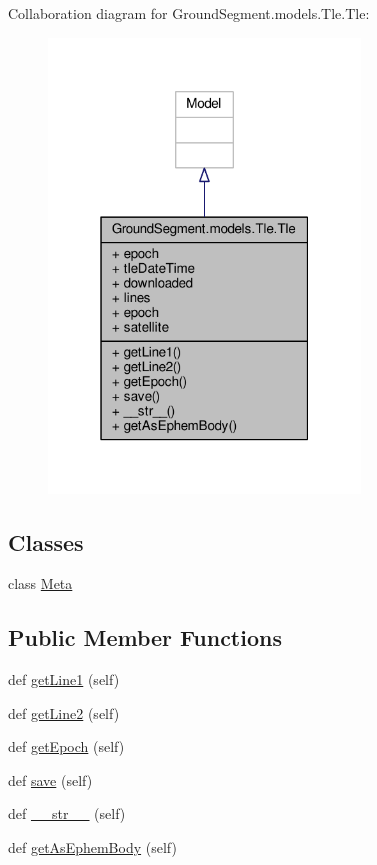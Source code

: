 Collaboration diagram for Ground\+Segment.\+models.\+Tle.\+Tle\+:\nopagebreak
\begin{figure}[H]
\begin{center}
\leavevmode
\includegraphics[width=235pt]{class_ground_segment_1_1models_1_1_tle_1_1_tle__coll__graph}
\end{center}
\end{figure}
\subsection*{Classes}
\begin{DoxyCompactItemize}
\item 
class \hyperlink{class_ground_segment_1_1models_1_1_tle_1_1_tle_1_1_meta}{Meta}
\end{DoxyCompactItemize}
\subsection*{Public Member Functions}
\begin{DoxyCompactItemize}
\item 
def \hyperlink{class_ground_segment_1_1models_1_1_tle_1_1_tle_aaa9c5ef171cfeab993957d279ded8364}{get\+Line1} (self)
\item 
def \hyperlink{class_ground_segment_1_1models_1_1_tle_1_1_tle_a904163c4f0018e52ddbd06a520787c6b}{get\+Line2} (self)
\item 
def \hyperlink{class_ground_segment_1_1models_1_1_tle_1_1_tle_a049797b0a8b8006dbe6c65c2fef60b33}{get\+Epoch} (self)
\item 
def \hyperlink{class_ground_segment_1_1models_1_1_tle_1_1_tle_af9530755ce563a47367a4636878d63bb}{save} (self)
\item 
def \hyperlink{class_ground_segment_1_1models_1_1_tle_1_1_tle_a4d73692ec117481d770952be352f0e6b}{\+\_\+\+\_\+str\+\_\+\+\_\+} (self)
\item 
def \hyperlink{class_ground_segment_1_1models_1_1_tle_1_1_tle_a336e418e8038a25a0953b828857bb2c8}{get\+As\+Ephem\+Body} (self)
\end{DoxyCompactItemize}
